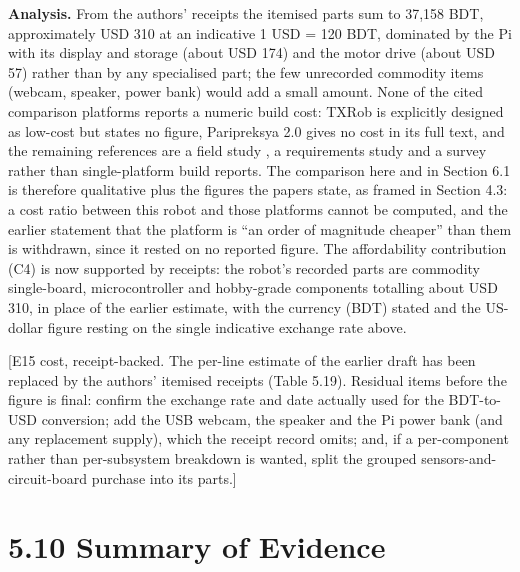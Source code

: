 \textbf{Analysis.} From the authors' receipts the itemised parts sum to 37,158 BDT, approximately USD 310 at an indicative 1 USD = 120 BDT, dominated by the Pi with its display and storage (about USD 174) and the motor drive (about USD 57) rather than by any specialised part; the few unrecorded commodity items (webcam, speaker, power bank) would add a small amount. None of the cited comparison platforms reports a numeric build cost: TXRob \cite{verano2022} is explicitly designed as low-cost but states no figure, Paripreksya 2.0 \cite{megalingam2022} gives no cost in its full text, and the remaining references are a field study \cite{casper2003}, a requirements study \cite{daun2023} and a survey \cite{liu2013} rather than single-platform build reports. The comparison here and in Section 6.1 is therefore qualitative plus the figures the papers state, as framed in Section 4.3: a cost ratio between this robot and those platforms cannot be computed, and the earlier statement that the platform is ``an order of magnitude cheaper'' than them is withdrawn, since it rested on no reported figure. The affordability contribution (C4) is now supported by receipts: the robot's recorded parts are commodity single-board, microcontroller and hobby-grade components totalling about USD 310, in place of the earlier estimate, with the currency (BDT) stated and the US-dollar figure resting on the single indicative exchange rate above.

[E15 cost, receipt-backed. The per-line estimate of the earlier draft has been replaced by the authors' itemised receipts (Table 5.19). Residual items before the figure is final: confirm the exchange rate and date actually used for the BDT-to-USD conversion; add the USB webcam, the speaker and the Pi power bank (and any replacement supply), which the receipt record omits; and, if a per-component rather than per-subsystem breakdown is wanted, split the grouped sensors-and-circuit-board purchase into its parts.]

\section*{5.10 Summary of Evidence}


